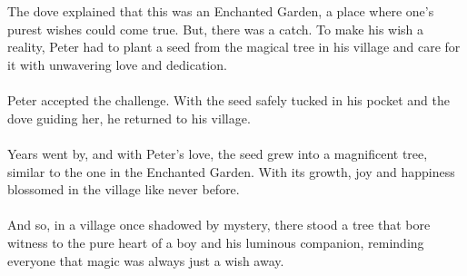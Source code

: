 \documentclass[10pt, fullpage, a4paper, titlepage]{article}
\begin{document}
\\~\\
The dove explained that this was an Enchanted Garden, a place where one’s purest wishes could come true. But, there was a catch. To make his wish a reality, Peter had to plant a seed from the magical tree in his village and care for it with unwavering love and dedication.
\\~\\
Peter accepted the challenge. With the seed safely tucked in his pocket and the dove guiding her, he returned to his village.
\\~\\
Years went by, and with Peter's love, the seed grew into a magnificent tree, similar to the one in the Enchanted Garden. With its growth, joy and happiness blossomed in the village like never before.
\\~\\
And so, in a village once shadowed by mystery, there stood a tree that bore witness to the pure heart of a boy and his luminous companion, reminding everyone that magic was always just a wish away.
\end{document}
